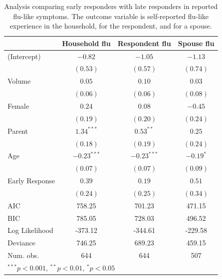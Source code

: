 \documentclass[12pt]{article}
\begin{document}
\begin{table}
\begin{center}
\begin{tabular}{l c c c }
\hline
 & Household flu & Respondent flu & Spouse flu \\
\hline
(Intercept)         & $-0.82$       & $-1.05$       & $-1.13$     \\
                    & $(0.53)$      & $(0.57)$      & $(0.74)$    \\
Volume              & $0.05$        & $0.10$        & $0.03$      \\
                    & $(0.06)$      & $(0.06)$      & $(0.08)$    \\
Female              & $0.24$        & $0.08$        & $-0.45$     \\
                    & $(0.19)$      & $(0.20)$      & $(0.24)$    \\
Parent              & $1.34^{***}$  & $0.53^{**}$   & $0.25$      \\
                    & $(0.18)$      & $(0.19)$      & $(0.24)$    \\
Age                 & $-0.23^{***}$ & $-0.23^{***}$ & $-0.19^{*}$ \\
                    & $(0.07)$      & $(0.07)$      & $(0.09)$    \\
Early Response      & $0.39$        & $0.19$        & $0.51$      \\
                    & $(0.24)$      & $(0.25)$      & $(0.34)$    \\
\hline
AIC                 & 758.25        & 701.23        & 471.15      \\
BIC                 & 785.05        & 728.03        & 496.52      \\
Log Likelihood      & -373.12       & -344.61       & -229.58     \\
Deviance            & 746.25        & 689.23        & 459.15      \\
Num. obs.           & 644           & 644           & 507         \\
\hline
\multicolumn{4}{l}{\scriptsize{$^{***}p<0.001$, $^{**}p<0.01$, $^*p<0.05$}}
\end{tabular}
\caption{Analysis comparing early responders with late responders in reported flu-like symptoms. The outcome variable is self-reported flu-like experience in the household, for the respondent, and for a spouse.}
\label{table:coefficients}
\end{center}
\end{table}
\end{document}
